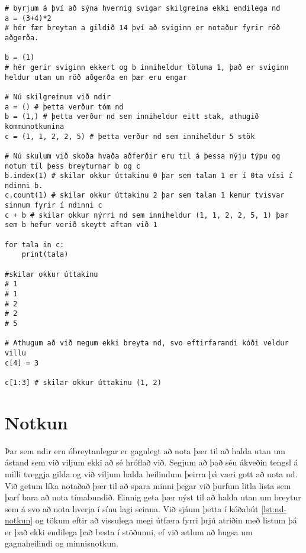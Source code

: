 \begin{lstlisting}[caption=Ndir skilgreindar, label=lst:ndir-kynntar]
# byrjum á því að sýna hvernig svigar skilgreina ekki endilega nd
a = (3+4)*2
# hér fær breytan a gildið 14 því að sviginn er notaður fyrir röð aðgerða.

b = (1)
# hér gerir sviginn ekkert og b inniheldur töluna 1, það er sviginn heldur utan um röð aðgerða en þær eru engar

# Nú skilgreinum við ndir
a = () # þetta verður tóm nd
b = (1,) # þetta verður nd sem inniheldur eitt stak, athugið kommunotkunina
c = (1, 1, 2, 2, 5) # þetta verður nd sem inniheldur 5 stök

# Nú skulum við skoða hvaða aðferðir eru til á þessa nýju týpu og notum til þess breyturnar b og c
b.index(1) # skilar okkur úttakinu 0 þar sem talan 1 er í 0ta vísi í ndinni b.
c.count(1) # skilar okkur úttakinu 2 þar sem talan 1 kemur tvisvar sinnum fyrir í ndinni c
c + b # skilar okkur nýrri nd sem inniheldur (1, 1, 2, 2, 5, 1) þar sem b hefur verið skeytt aftan við 1

for tala in c:
	print(tala)
	
#skilar okkur úttakinu
# 1
# 1
# 2
# 2
# 5

# Athugum að við megum ekki breyta nd, svo eftirfarandi kóði veldur villu
c[4] = 3

c[1:3] # skilar okkur úttakinu (1, 2)
\end{lstlisting}

\section{Notkun}
Þar sem ndir eru óbreytanlegar er gagnlegt að nota þær til að halda utan um ástand sem við viljum ekki að sé hróflað við.
Segjum að það séu ákveðin tengsl á milli tveggja gilda og við viljum halda heilindum þeirra þá væri gott að nota nd.
Við getum líka notaðað þær til að spara minni þegar við þurfum litla lista sem þarf bara að nota tímabundið.
Einnig geta þær nýst til að halda utan um breytur sem á svo að nota hverja í sínu lagi seinna.
Við sjáum þetta í kóðabút \ref{lst:nd-notkun} og tökum eftir að vissulega megi útfæra fyrri þrjú atriðin með listum þá er það ekki endilega það besta í stöðunni, ef við ætlum að hugsa um gagnaheilindi og minnisnotkun.

